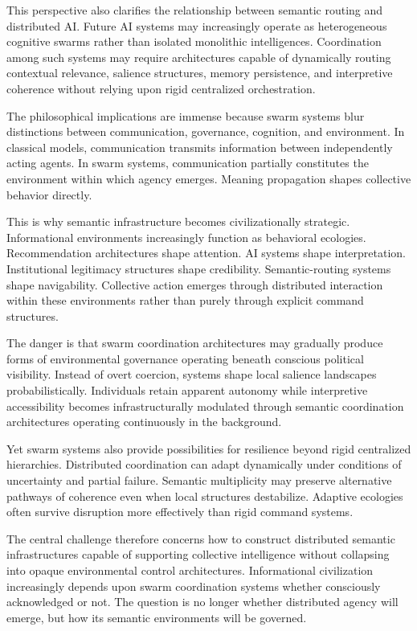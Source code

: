 \documentclass[11pt,a4paper]{article}
\begin{document}
This perspective also clarifies the relationship between semantic routing and distributed AI. Future AI systems may increasingly operate as heterogeneous cognitive swarms rather than isolated monolithic intelligences. Coordination among such systems may require architectures capable of dynamically routing contextual relevance, salience structures, memory persistence, and interpretive coherence without relying upon rigid centralized orchestration.

The philosophical implications are immense because swarm systems blur distinctions between communication, governance, cognition, and environment. In classical models, communication transmits information between independently acting agents. In swarm systems, communication partially constitutes the environment within which agency emerges. Meaning propagation shapes collective behavior directly.

This is why semantic infrastructure becomes civilizationally strategic. Informational environments increasingly function as behavioral ecologies. Recommendation architectures shape attention. AI systems shape interpretation. Institutional legitimacy structures shape credibility. Semantic-routing systems shape navigability. Collective action emerges through distributed interaction within these environments rather than purely through explicit command structures.

The danger is that swarm coordination architectures may gradually produce forms of environmental governance operating beneath conscious political visibility. Instead of overt coercion, systems shape local salience landscapes probabilistically. Individuals retain apparent autonomy while interpretive accessibility becomes infrastructurally modulated through semantic coordination architectures operating continuously in the background.

Yet swarm systems also provide possibilities for resilience beyond rigid centralized hierarchies. Distributed coordination can adapt dynamically under conditions of uncertainty and partial failure. Semantic multiplicity may preserve alternative pathways of coherence even when local structures destabilize. Adaptive ecologies often survive disruption more effectively than rigid command systems.

The central challenge therefore concerns how to construct distributed semantic infrastructures capable of supporting collective intelligence without collapsing into opaque environmental control architectures. Informational civilization increasingly depends upon swarm coordination systems whether consciously acknowledged or not. The question is no longer whether distributed agency will emerge, but how its semantic environments will be governed.
\end{document}
